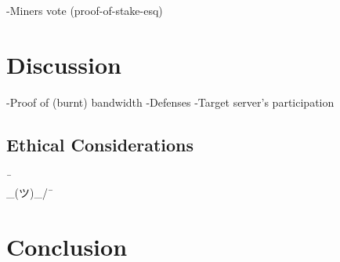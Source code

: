-Miners vote (proof-of-stake-esq)




\section{Discussion}

-Proof of (burnt) bandwidth
-Defenses
-Target server's participation

\subsection{Ethical Considerations}
¯\\\_(ツ)\_/¯

\section{Conclusion}



{\footnotesize\balance

}


